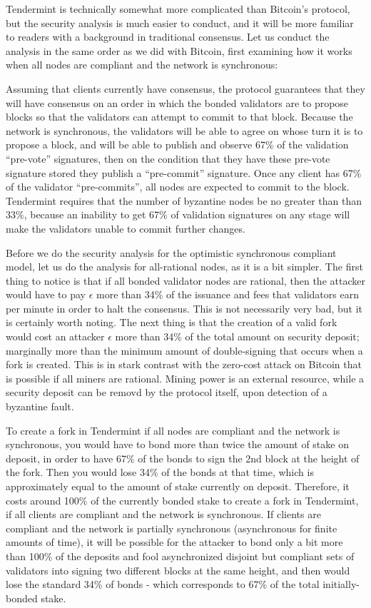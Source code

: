 \documentclass[11pt,a4paper]{article}
\theoremstyle{plain}
\theoremstyle{definition}
\begin{document}
Tendermint is technically somewhat more complicated than Bitcoin's protocol, but the security analysis is much easier to conduct, and it will be more familiar to readers with a background in traditional consensus. Let us conduct the analysis in the same order as we did with Bitcoin, first examining how it works when all nodes are compliant and the network is synchronous:

Assuming that clients currently have consensus, the protocol guarantees that they will have consensus on an order in which the bonded validators are to propose blocks so that the validators can attempt to commit to that block. Because the network is synchronous, the validators will be able to agree on whose turn it is to propose a block, and will be able to publish and observe 67\% of the validation ``pre-vote'' signatures, then on the condition that they have these pre-vote signature stored they publish a ``pre-commit'' signature. Once any client has 67\% of the validator ``pre-commits'', all nodes are expected to commit to the block. Tendermint requires that the number of byzantine nodes be no greater than than 33\%, because an inability to get 67\% of validation signatures on any stage will make the validators unable to commit further changes. 

Before we do the security analysis for the optimistic synchronous compliant model, let us do the analysis for all-rational nodes, as it is a bit simpler. The first thing to notice is that if all bonded validator nodes are rational, then the attacker would have to pay $\epsilon$ more than 34\% of the issuance and fees that validators earn per minute in order to halt the consensus. This is not necessarily very bad, but it is certainly worth noting. The next thing is that the creation of a valid fork would cost an attacker $\epsilon$ more than 34\% of the total amount on security deposit; marginally more than the minimum amount of double-signing that occurs when a fork is created. This is in stark contrast with the zero-cost attack on Bitcoin that is possible if all miners are rational. Mining power is an external resource, while a security deposit can be removd by the protocol itself, upon detection of a byzantine fault.

To create a fork in Tendermint if all nodes are compliant and the network is synchronous, you would have to bond more than twice the amount of stake on deposit, in order to have 67\% of the bonds to sign the 2nd block at the height of the fork. Then you would lose 34\% of the bonds at that time, which is approximately equal to the amount of stake currently on deposit. Therefore, it costs around 100\% of the currently bonded stake to create a fork in Tendermint, if all clients are compliant and the network is synchronous. If clients are compliant and the network is partially synchronous (asynchronous for finite amounts of time), it will be possible for the attacker to bond only a bit more than 100\% of the deposits and fool asynchronized disjoint but compliant sets of validators into signing two different blocks at the same height, and then would lose the standard 34\% of bonds - which corresponds to 67\% of the total initially-bonded stake. 
\end{document}

